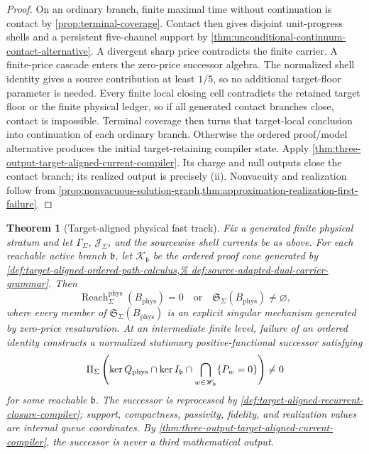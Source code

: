 \documentclass[11pt]{article}
\numberwithin{section}{part}
\theoremstyle{plain}
\newtheorem{theorem}{Theorem}[section]
\theoremstyle{definition}
\theoremstyle{remark}
\newcommand{\Reach}{\operatorname{Reach}}
\newcommand{\Phys}{\mathrm{phys}}
\newcommand{\Budget}{B_{\Phys}}
\begin{document}
\begin{proof}
On an ordinary branch, finite maximal time
without continuation is contact by \cref{prop:terminal-coverage}.  Contact
then gives disjoint unit-progress shells and a persistent five-channel
support by \cref{thm:unconditional-continuum-contact-alternative}.  A
divergent sharp price contradicts the finite carrier.  A finite-price cascade
enters the zero-price successor algebra.  The normalized shell identity gives
a source contribution at least \(1/5\), so no additional target-floor
parameter is needed.  Every finite local closing cell contradicts the
retained target floor or the finite physical ledger, so if all generated
contact branches close, contact is impossible.  Terminal coverage then turns
that target-local conclusion into continuation of each ordinary branch.
Otherwise the ordered proof/model alternative produces the initial
target-retaining compiler state.  Apply
\cref{thm:three-output-target-aligned-current-compiler}.  Its charge and null
outputs close the contact branch; its realized output is precisely
\textup{(ii)}.  Nonvacuity and realization
follow from
\cref{prop:nonvacuous-solution-graph,thm:approximation-realization-first-failure}.
\end{proof}

\begin{theorem}[Target-aligned physical fast track]
\label{thm:target-aligned-physical-fast-track}
Fix a generated finite physical stratum and let
\(\Gamma_\Sigma\), \(\mathscr J_\Sigma\), and the sourcewise shell currents be
as above.  For each reachable active branch \(\mathfrak b\), let
\(\mathcal K_{\mathfrak b}\) be the ordered proof cone generated by
\cref{def:target-aligned-ordered-path-calculus,%
def:source-adapted-dual-carrier-grammar}.  Then
\begin{equation}
 \label{eq:fast-track-proof-model-alternative}
 \boxed{
 \Reach_\Sigma^{\Phys}(\Budget)=0
 \quad\text{or}\quad
 \mathfrak S_\Sigma(\Budget)\ne\varnothing,}
\end{equation}
where every member of \(\mathfrak S_\Sigma(\Budget)\) is an explicit singular
mechanism generated by zero-price resaturation.  At an intermediate finite
level, failure of an ordered identity constructs a normalized stationary
positive-functional successor satisfying
\begin{equation}
 \label{eq:fast-track-kernel}
 \Pi_\Sigma
 \left(
  \ker Q_{\rm phys}\cap
  \ker I_{\mathfrak b}\cap
  \bigcap_{w\in\mathscr W_{\mathfrak b}}\{P_w=0\}
 \right)\ne0
\end{equation}
for some reachable \(\mathfrak b\).  The successor is reprocessed by
\cref{def:target-aligned-recurrent-closure-compiler}; support, compactness,
passivity, fidelity, and realization values are internal queue coordinates.
By \cref{thm:three-output-target-aligned-current-compiler}, the successor is
never a third mathematical output.
\end{theorem}
\end{document}
